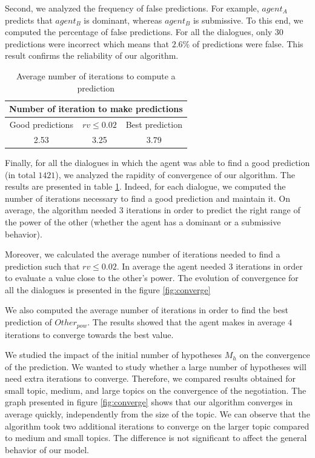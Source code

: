 \documentclass[conference, letterpaper]{IEEEtran}
\begin{document}
	Second, we analyzed the frequency of false predictions. For example, $agent_A$ predicts that $agent_B$ is dominant, whereas $agent_B$ is submissive. To this end, we computed the percentage of false predictions. For all the dialogues, only $30$ predictions were incorrect which means that $ 2.6 \% $ of predictions were false. This result confirms the reliability of our algorithm. 
	\begin{table}[h]
		\begin{tabular}{|c|c|c|}
			\hline
			\multicolumn{3}{|c|}{Number of iteration to make predictions} \\
			\hline
			Good predictions & $rv \leq 0.02$ & Best prediction \\
			\hline
			2.53 & 3.25 & 3.79\\
			\hline
		\end{tabular}
		\caption{Average number of iterations to compute a prediction} 
		\label{tab:conv}
	\end{table}
	Finally, for all the dialogues in which the agent was able to find a good prediction (in total $1421$), we analyzed the rapidity of convergence of our algorithm. The results are presented in table \ref{tab:conv}. Indeed, for each dialogue, we computed the number of iterations necessary to find a good prediction and maintain it. On average, the algorithm needed $3$ iterations in order to predict the right range of the power of the other (whether the agent has a dominant or a submissive behavior). 
	
	Moreover, we calculated the average number of iterations needed to find a prediction such that $rv \leq 0.02$. In average the agent needed $3$ iterations in order to evaluate a value close to the other's power. The evolution of convergence for all the dialogues is presented in the figure \ref{fig:converge}
	
	We also computed the average number of iterations in order to find the best prediction of $Other_{pow}$. The results showed that the agent makes in average $4$ iterations to converge towards the best value.  

	
	We studied the impact of the initial number of hypotheses $M_h$ on the convergence of the prediction. We wanted to study whether a large number of hypotheses will need extra iterations to converge. Therefore, we compared results obtained for small topic, medium, and large topics on the convergence of the negotiation. The graph presented in figure \ref{fig:converge} shows that our algorithm converges in average quickly, independently from the size of the topic. We can observe that the algorithm took two additional iterations to converge on the larger topic compared to medium and small topics. The difference is not significant to affect the general behavior of our model.
	
\end{document}
